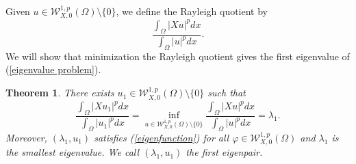 \documentclass[a4paper,12pt,reqno]{amsart}
\renewcommand\eqref[1]{(\ref{#1})} %
\numberwithin{equation}{section}
\theoremstyle{plain}
\newtheorem{theorem}{Theorem}[section]
\theoremstyle{definition}
\begin{document}
Given $u \in \mathcal{W}_{X,0}^{1, p}(\Omega) \setminus\{0\}$, we define the Rayleigh quotient by
\begin{equation}\label{Rayleigh quotient}
\frac{\int_{\Omega}|X u|^p d x}{\int_{\Omega}|u|^p d x}.
\end{equation}
We will show  that minimization  the Rayleigh quotient gives the first eigenvalue of \eqref{eigenvalue problem}. 
\begin{theorem}\label{existence and uniqueness of the Rayleigh quotient}
There exists    $u_{1}\in \mathcal{W}_{X,0}^{1, p}(\Omega)\setminus\{0\}$   such that
$$\frac{\int_{\Omega}|X u_{1}|^p d x}{\int_{\Omega}|u_{1}|^p d x} =\inf_{u \in \mathcal{W}_{X,0}^{1, p}(\Omega)\setminus\{0\}}\frac{\int_{\Omega}|X u|^p d x}{\int_{\Omega}|u|^p d x} =\lambda_{1}.$$
Moreover, $(\lambda_{1}, u_{1})$ satisfies \eqref{eigenfunction} for all  $\varphi\in \mathcal{W}_{X,0}^{1, p}(\Omega)$ and $\lambda_{1}$ is the smallest eigenvalue. We call $(\lambda_{1}, u_{1})$ the first eigenpair.
\end{theorem}
\end{document}
